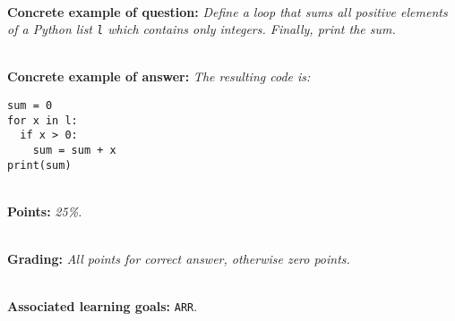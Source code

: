 \ \\ 

\textbf{Concrete example of question:} \textit{Define a loop that sums all positive elements of a Python list \texttt{l} which contains only integers. Finally, print the sum.}

\ \\ 

\textbf{Concrete example of answer:} \textit{The resulting code is:}

\begin{lstlisting}
sum = 0
for x in l:
  if x > 0:
    sum = sum + x
print(sum)
\end{lstlisting}

\ \\ 

\textbf{Points:} \textit{25\%.}

\ \\ 

\textbf{Grading:} \textit{All points for correct answer, otherwise zero points.}

\ \\ 

\textbf{Associated learning goals:} \texttt{ARR}.

\ \\
